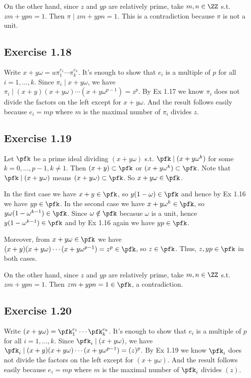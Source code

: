 \documentclass[../Chapter.tex]{subfiles}
\begin{document}
On the other hand, since $z$ and $yp$ are relatively prime, take $m,n\in\ZZ$ s.t. $zm+ypn=1$. Then $\pi\mid zm+ypn=1$. This is a contradiction because $\pi$ is not a unit.

\subsection*{Exercise 1.18}

Write $x+y\omega=u\pi_1^{e_1}\cdots\pi_k^{e_k}$. It's enough to show that $e_i$ is a multiple of $p$ for all $i=1,\ldots,k$. Since $\pi_i\mid x+y\omega$, we have $\pi_i\mid (x+y)(x+y\omega)\cdots(x+y\omega^{p-1})=z^p$. By Ex 1.17 we know $\pi_i$ does not divide the factors on the left except for $x+y\omega$. And the result follows easily because $e_i=mp$ where $m$ is the maximal number of $\pi_i$ divides $z$.

\subsection*{Exercise 1.19}

Let $\pfk$ be a prime ideal dividing $(x+y\omega)$ s.t. $\pfk\mid (x+y\omega^k)$ for some $k=0,\ldots,p-1,k\neq 1$. Then $(x+y)\subset\pfk$ or $(x+y\omega^k)\subset\pfk$. Note that $\pfk\mid (x+y\omega)$ means $(x+y\omega)\subset \pfk$. So $x+y\omega\in\pfk$.

In the first case we have $x+y\in\pfk$, so $y(1-\omega)\in\pfk$ and hence by Ex 1.16 we have $yp\in\pfk$. In the second case we have $x+y\omega^k\in\pfk$, so $y\omega(1-\omega^{k-1})\in\pfk$. Since $\omega\notin\pfk$ becasue $\omega$ is a unit, hence $y(1-\omega^{k-1})\in\pfk$ and by Ex 1.16 again we have $yp\in\pfk$.

Moreover, from $x+y\omega\in\pfk$ we have $(x+y)(x+y\omega)\cdots(x+y\omega^{p-1})=z^p\in\pfk$, so $z\in\pfk$. Thus, $z,yp\in\pfk$ in both cases.

On the other hand, since $z$ and $yp$ are relatively prime, take $m,n\in\ZZ$ s.t. $zm+ypn=1$. Then $zm+ypn=1\in\pfk$, a contradiction.

\subsection*{Exercise 1.20}

Write $(x+y\omega)=\pfk_1^{e_1}\cdots\pfk_k^{e_k}$. It's enough to show that $e_i$ is a multiple of $p$ for all $i=1,\ldots,k$. Since $\pfk_i\mid(x+y\omega)$, we have $\pfk_i\mid(x+y)(x+y\omega)\cdots(x+y\omega^{p-1})=(z)^p$. By Ex 1.19 we know $\pfk_i$ does not divide the factors on the left except for $(x+y\omega)$. And the result follows easily because $e_i=mp$ where $m$ is the maximal number of $\pfk_i$ divides $(z)$.
\end{document}
